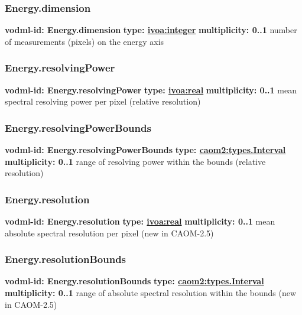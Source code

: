     \subsubsection{Energy.dimension}
      \textbf{vodml-id: Energy.dimension} \newline
      \textbf{type: \hyperref[sect:ivoa]{ivoa:integer}} \newline
      \textbf{multiplicity: 0..1} \newline
      number of measurements (pixels) on the energy axis

    \subsubsection{Energy.resolvingPower}
      \textbf{vodml-id: Energy.resolvingPower} \newline
      \textbf{type: \hyperref[sect:ivoa]{ivoa:real}} \newline
      \textbf{multiplicity: 0..1} \newline
      mean spectral resolving power per pixel (relative resolution)

    \subsubsection{Energy.resolvingPowerBounds}
      \textbf{vodml-id: Energy.resolvingPowerBounds} \newline
      \textbf{type: \hyperref[sect:types.Interval]{caom2:types.Interval}} \newline
      \textbf{multiplicity: 0..1} \newline
      range of resolving power within the bounds (relative resolution)

    \subsubsection{Energy.resolution}
      \textbf{vodml-id: Energy.resolution} \newline
      \textbf{type: \hyperref[sect:ivoa]{ivoa:real}} \newline
      \textbf{multiplicity: 0..1} \newline
      mean absolute spectral resolution per pixel (new in CAOM-2.5)

    \subsubsection{Energy.resolutionBounds}
      \textbf{vodml-id: Energy.resolutionBounds} \newline
      \textbf{type: \hyperref[sect:types.Interval]{caom2:types.Interval}} \newline
      \textbf{multiplicity: 0..1} \newline
      range of absolute spectral resolution within the bounds (new in CAOM-2.5)

